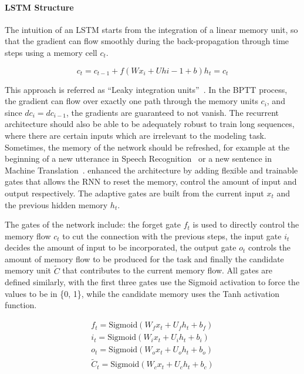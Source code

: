 \paragraph{LSTM Structure} The intuition of an LSTM starts from the integration of a linear memory unit, so that the gradient can flow smoothly during the back-propagation through time steps using a memory cell $c_t$. 

\begin{equation}
c_t = c_{t-1} + f(Wx_i +  Uh{i-1} + b)
h_t = c_t
\end{equation}

This approach is referred as ``Leaky integration units''~\cite{bengio2013advances}. In the BPTT process, the gradient can flow over exactly one path through the memory units $c_i$, and since $dc_i = dc_{i-1}$, the gradients are guaranteed to not vanish. The recurrent architecture should also be able to be adequately robust to train long sequences, where there are certain inputs which are irrelevant to the modeling task. Sometimes, the memory of the network should be refreshed, for example at the beginning of a new utterance in Speech Recognition~\cite{graves2005framewise} or a new sentence in Machine Translation~\cite{sutskever2014sequence}.  enhanced the architecture by adding flexible and trainable gates that allows the RNN to reset the memory, control the amount of input and output respectively. The adaptive gates are built from the current input $x_t$ and the previous hidden memory $h_t$. 

The gates of the network include: the forget gate $f_t$ is used to directly control the memory flow $c_t$ to cut the connection with the previous steps, the input gate $i_t$ decides the amount of input to be incorporated, the output gate $o_t$ controls the amount of memory flow to be produced for the task and finally the candidate memory unit $\tilde{C}$ that contributes to the current memory flow. All gates are defined similarly, with the first three gates use the Sigmoid activation to force the values to be in \{0, 1\}, while the candidate memory uses the Tanh activation function.

\begin{equation}
\begin{aligned}
f_t = \text{Sigmoid}(W_fx_t + U_fh_t + b_f) \\
i_t = \text{Sigmoid}(W_ix_t + U_ih_t + b_i) \\
o_t = \text{Sigmoid}(W_ox_t + U_oh_t + b_o) \\
\tilde{C}_t = \text{Sigmoid}(W_cx_t + U_ch_t + b_c) \\
\end{aligned}
\label{eq:lstm1}
\end{equation}

